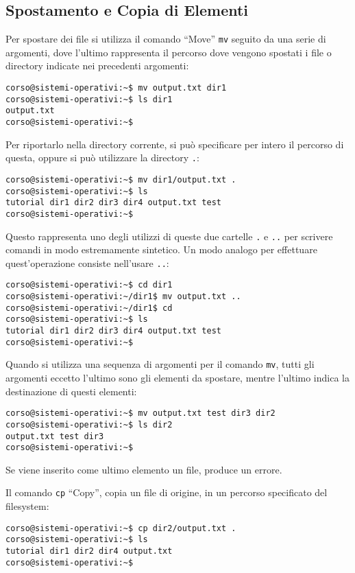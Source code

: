 \documentclass{article}
\numberwithin{equation}{subsection}
\begin{document}
\subsection{Spostamento e Copia di Elementi}

Per spostare dei file si utilizza il comando ``Move'' \verb|mv| seguito da una serie di argomenti, dove l'ultimo rappresenta il percorso dove vengono spostati i file o directory indicate nei precedenti argomenti:
\begin{verbatim}
corso@sistemi-operativi:~$ mv output.txt dir1
corso@sistemi-operativi:~$ ls dir1
output.txt
corso@sistemi-operativi:~$
\end{verbatim}
Per riportarlo nella directory corrente, si può specificare per intero il percorso di questa, oppure si può utilizzare la directory \verb|.|:
\begin{verbatim}
corso@sistemi-operativi:~$ mv dir1/output.txt .
corso@sistemi-operativi:~$ ls 
tutorial dir1 dir2 dir3 dir4 output.txt test
corso@sistemi-operativi:~$
\end{verbatim}
Questo rappresenta uno degli utilizzi di queste due cartelle \verb|.| e \verb|..| per scrivere comandi in modo estremamente sintetico. 
Un modo analogo per effettuare quest'operazione consiste nell'usare \verb|..|:
\begin{verbatim}
corso@sistemi-operativi:~$ cd dir1
corso@sistemi-operativi:~/dir1$ mv output.txt ..
corso@sistemi-operativi:~/dir1$ cd
corso@sistemi-operativi:~$ ls 
tutorial dir1 dir2 dir3 dir4 output.txt test
corso@sistemi-operativi:~$
\end{verbatim}

Quando si utilizza una sequenza di argomenti per il comando \verb|mv|, tutti gli argomenti eccetto l'ultimo sono gli elementi da spostare, mentre l'ultimo indica la destinazione di questi elementi:
\begin{verbatim}
corso@sistemi-operativi:~$ mv output.txt test dir3 dir2
corso@sistemi-operativi:~$ ls dir2
output.txt test dir3
corso@sistemi-operativi:~$
\end{verbatim}
Se viene inserito come ultimo elemento un file, produce un errore. 

Il comando \verb|cp| ``Copy'', copia un file di origine, in un percorso specificato del filesystem:
\begin{verbatim}
corso@sistemi-operativi:~$ cp dir2/output.txt .
corso@sistemi-operativi:~$ ls
tutorial dir1 dir2 dir4 output.txt
corso@sistemi-operativi:~$
\end{verbatim} 
\end{document}
